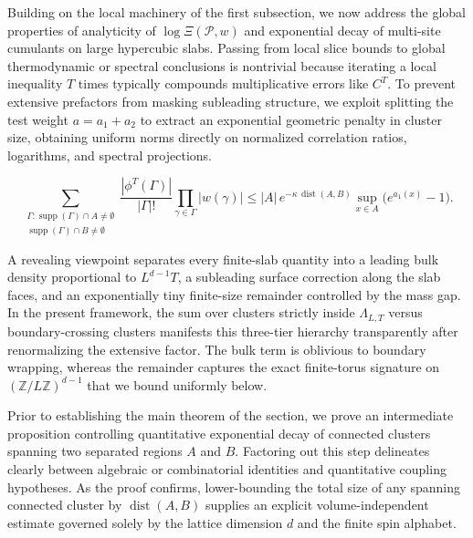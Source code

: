 \documentclass[11pt]{article}
\theoremstyle{definition}
\begin{document}
Building on the local machinery of the first subsection, we now address the global
properties of analyticity of $\log \Xi(\mathcal{P}, w)$ and exponential decay of
multi-site cumulants on large hypercubic slabs. Passing from local slice bounds to
global thermodynamic or spectral conclusions is nontrivial because iterating a local
inequality $T$ times typically compounds multiplicative errors like $C^T$. To
prevent extensive prefactors from masking subleading structure, we exploit splitting
the test weight $a = a_1 + a_2$ to extract an exponential geometric penalty in
cluster size, obtaining uniform norms directly on normalized correlation ratios,
logarithms, and spectral projections.

\[
  \sum_{\substack{\Gamma : \operatorname{supp}(\Gamma) \cap A \neq \emptyset \\ \operatorname{supp}(\Gamma) \cap B \neq \emptyset}} \frac{|\phi^T(\Gamma)|}{|\Gamma|!} \prod_{\gamma \in \Gamma} |w(\gamma)| \le |A| \, e^{-\kappa \, \operatorname{dist}(A, B)} \sup_{x \in A} \bigl(e^{a_1(x)} - 1\bigr).
\]

A revealing viewpoint separates every finite-slab quantity into a leading bulk
density proportional to $L^{d-1} T$, a subleading surface correction along the slab
faces, and an exponentially tiny finite-size remainder controlled by the mass gap.
In the present framework, the sum over clusters strictly inside $\Lambda_{L,T}$
versus boundary-crossing clusters manifests this three-tier hierarchy transparently
after renormalizing the extensive factor. The bulk term is oblivious to boundary
wrapping, whereas the remainder captures the exact finite-torus signature on
$(\mathbb{Z}/L\mathbb{Z})^{d-1}$ that we bound uniformly below.

Prior to establishing the main theorem of the section, we prove an intermediate
proposition controlling quantitative exponential decay of connected clusters
spanning two separated regions $A$ and $B$. Factoring out this step delineates
clearly between algebraic or combinatorial identities and quantitative coupling
hypotheses. As the proof confirms, lower-bounding the total size of any spanning
connected cluster by $\operatorname{dist}(A, B)$ supplies an explicit
volume-independent estimate governed solely by the lattice dimension $d$ and the
finite spin alphabet.
\end{document}
